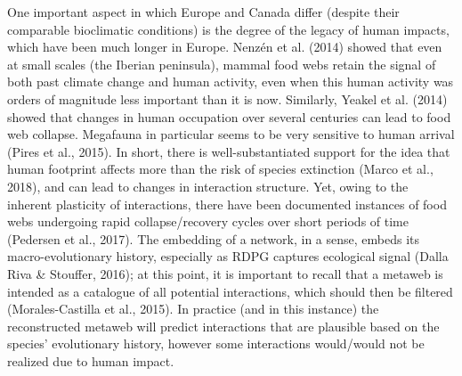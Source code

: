 \documentclass[10pt,oneside]{article}
\begin{document}
One important aspect in which Europe and Canada differ (despite their
comparable bioclimatic conditions) is the degree of the legacy of human
impacts, which have been much longer in Europe. Nenzén et al. (2014)
showed that even at small scales (the Iberian peninsula), mammal food
webs retain the signal of both past climate change and human activity,
even when this human activity was orders of magnitude less important
than it is now. Similarly, Yeakel et al. (2014) showed that changes in
human occupation over several centuries can lead to food web collapse.
Megafauna in particular seems to be very sensitive to human arrival
(Pires et al., 2015). In short, there is well-substantiated support for
the idea that human footprint affects more than the risk of species
extinction (Marco et al., 2018), and can lead to changes in interaction
structure. Yet, owing to the inherent plasticity of interactions, there
have been documented instances of food webs undergoing rapid
collapse/recovery cycles over short periods of time (Pedersen et al.,
2017). The embedding of a network, in a sense, embeds its
macro-evolutionary history, especially as RDPG captures ecological
signal (Dalla Riva \& Stouffer, 2016); at this point, it is important to
recall that a metaweb is intended as a catalogue of all potential
interactions, which should then be filtered (Morales-Castilla et al.,
2015). In practice (and in this instance) the reconstructed metaweb will
predict interactions that are plausible based on the species'
evolutionary history, however some interactions would/would not be
realized due to human impact.
\end{document}
